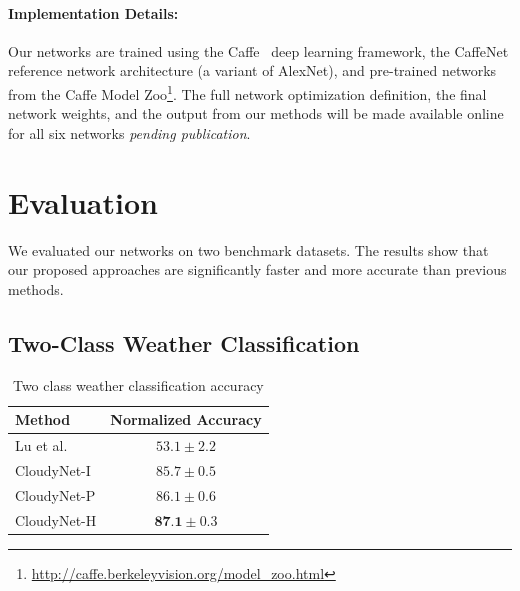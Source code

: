 \documentclass[10pt,twocolumn,letterpaper]{article}
\newcommand{\todo}[1]{\textcolor{red}{todo: {\em #1}}}
\begin{document}
%

\vspace{-1em}
\paragraph{Implementation Details:} Our networks are trained using the
Caffe~\cite{caffe14} deep learning framework, the CaffeNet reference network
architecture (a variant of AlexNet), and pre-trained networks from the Caffe
Model Zoo\footnote{\url{http://caffe.berkeleyvision.org/model_zoo.html}}.  The
full network optimization definition, the final network weights, and the output
from our methods will be made available online for all six networks
\emph{pending publication}.


\section{Evaluation}

We evaluated our networks on two benchmark datasets. The results show
that our proposed approaches are significantly faster and more
accurate than previous methods. 

\subsection{Two-Class Weather Classification}

\begin{table}[t]
	\centering
	\caption{Two class weather classification accuracy}
	\begin{tabular}{ | l | c | }
		\hline
			Method & Normalized Accuracy \\ \hline \hline
			Lu et al.~\cite{lutwoclass}& $ 53.1 \pm 2.2 $ \\ \hline
			CloudyNet-I & $ 85.7 \pm 0.5 $ \\ \hline
			CloudyNet-P & $ 86.1 \pm 0.6 $ \\ \hline
			CloudyNet-H & $ \textbf{87.1} \pm 0.3 $ \\ 
		\hline
	\end{tabular}
	\label{tbl:twoclass}
\end{table}
\end{document}
